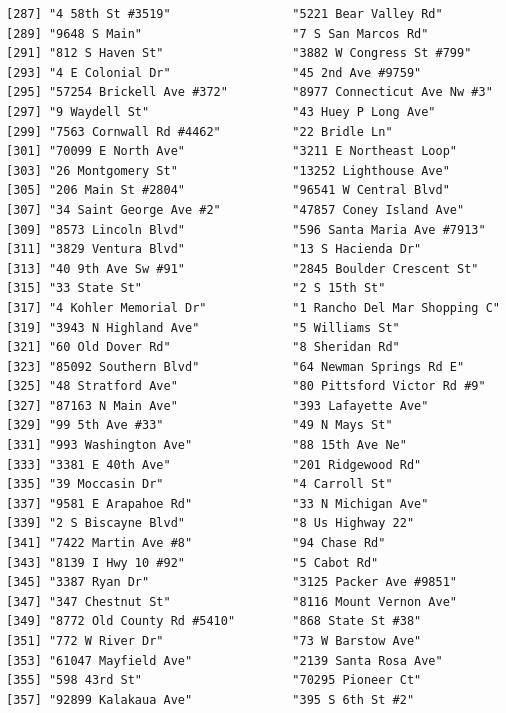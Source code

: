 \documentclass[
  12pt,
]{article}
\begin{document}
\begin{verbatim}
[287] "4 58th St #3519"                 "5221 Bear Valley Rd"            
[289] "9648 S Main"                     "7 S San Marcos Rd"              
[291] "812 S Haven St"                  "3882 W Congress St #799"        
[293] "4 E Colonial Dr"                 "45 2nd Ave #9759"               
[295] "57254 Brickell Ave #372"         "8977 Connecticut Ave Nw #3"     
[297] "9 Waydell St"                    "43 Huey P Long Ave"             
[299] "7563 Cornwall Rd #4462"          "22 Bridle Ln"                   
[301] "70099 E North Ave"               "3211 E Northeast Loop"          
[303] "26 Montgomery St"                "13252 Lighthouse Ave"           
[305] "206 Main St #2804"               "96541 W Central Blvd"           
[307] "34 Saint George Ave #2"          "47857 Coney Island Ave"         
[309] "8573 Lincoln Blvd"               "596 Santa Maria Ave #7913"      
[311] "3829 Ventura Blvd"               "13 S Hacienda Dr"               
[313] "40 9th Ave Sw #91"               "2845 Boulder Crescent St"       
[315] "33 State St"                     "2 S 15th St"                    
[317] "4 Kohler Memorial Dr"            "1 Rancho Del Mar Shopping C"    
[319] "3943 N Highland Ave"             "5 Williams St"                  
[321] "60 Old Dover Rd"                 "8 Sheridan Rd"                  
[323] "85092 Southern Blvd"             "64 Newman Springs Rd E"         
[325] "48 Stratford Ave"                "80 Pittsford Victor Rd #9"      
[327] "87163 N Main Ave"                "393 Lafayette Ave"              
[329] "99 5th Ave #33"                  "49 N Mays St"                   
[331] "993 Washington Ave"              "88 15th Ave Ne"                 
[333] "3381 E 40th Ave"                 "201 Ridgewood Rd"               
[335] "39 Moccasin Dr"                  "4 Carroll St"                   
[337] "9581 E Arapahoe Rd"              "33 N Michigan Ave"              
[339] "2 S Biscayne Blvd"               "8 Us Highway 22"                
[341] "7422 Martin Ave #8"              "94 Chase Rd"                    
[343] "8139 I Hwy 10 #92"               "5 Cabot Rd"                     
[345] "3387 Ryan Dr"                    "3125 Packer Ave #9851"          
[347] "347 Chestnut St"                 "8116 Mount Vernon Ave"          
[349] "8772 Old County Rd #5410"        "868 State St #38"               
[351] "772 W River Dr"                  "73 W Barstow Ave"               
[353] "61047 Mayfield Ave"              "2139 Santa Rosa Ave"            
[355] "598 43rd St"                     "70295 Pioneer Ct"               
[357] "92899 Kalakaua Ave"              "395 S 6th St #2"                

\end{verbatim}
\end{document}
